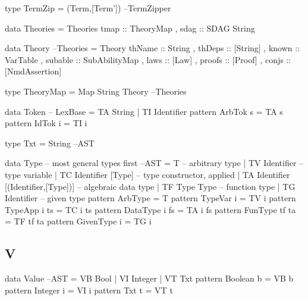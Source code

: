 \begin{code}
type TermZip = (Term,[Term'])                                    --TermZipper
\end{code}

\begin{code}
data Theories
  = Theories { tmap :: TheoryMap
             , sdag :: SDAG String }
\end{code}

\begin{code}
data Theory                                                         --Theories
  = Theory {
      thName   :: String
    , thDeps   :: [String]
    , known    :: VarTable
    , subable  :: SubAbilityMap
    , laws     :: [Law]
    , proofs   :: [Proof]
    , conjs    :: [NmdAssertion]
    }
\end{code}

\begin{code}
type TheoryMap = Map String Theory                                  --Theories
\end{code}

\begin{code}
data Token                                                         -- LexBase
 = TA String
 | TI Identifier
pattern ArbTok s = TA s
pattern IdTok i = TI i
\end{code}

\begin{code}
type Txt = String                                                        --AST
\end{code}


\begin{code}
data Type -- most general types first                                   --AST
 = T  -- arbitrary type
 | TV Identifier -- type variable
 | TC Identifier [Type] -- type constructor, applied
 | TA Identifier [(Identifier,[Type])] -- algebraic data type
 | TF Type Type -- function type
 | TG Identifier -- given type
pattern ArbType = T
pattern TypeVar i  = TV i
pattern TypeApp i ts = TC i ts
pattern DataType i fs = TA i fs
pattern FunType tf ta = TF tf ta
pattern GivenType i = TG i
\end{code}


\subsection{V}

\begin{code}
data Value                                                               --AST
 = VB Bool
 | VI Integer
 | VT Txt
pattern Boolean b  =  VB b
pattern Integer i  =  VI i
pattern Txt     t  =  VT t
\end{code}


